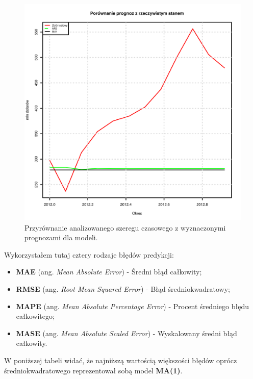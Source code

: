 \documentclass[11pt]{article}
\begin{document}
\begin{figure}[h]
    \centering
	\includegraphics[width=\textwidth]{images/mieszane.png}
    \caption{Przyrównanie analizowanego szeregu czasowego z wyznaczonymi prognozami dla modeli.}
    \label{fig:mieszane}

\end{figure}

\newpage

Wykorzystałem tutaj cztery rodzaje błędów predykcji:

\begin{itemize}
\item \textbf{MAE} (ang. \textit{Mean Absolute Error}) - Średni błąd całkowity;
\item \textbf{RMSE} (ang. \textit{Root Mean Squared Error}) - Błąd średniokwadratowy;
\item \textbf{MAPE} (ang. \textit{Mean Absolute Percentage Error}) - Procent średniego błędu całkowitego;
\item \textbf{MASE} (ang. \textit{Mean Absolute Scaled Error}) - Wyskalowany średni błąd całkowity.
\end{itemize}

W poniższej tabeli widać, że najniższą wartością większości błędów oprócz średniokwadratowego reprezentował sobą model \textbf{MA(1)}.
\end{document}
